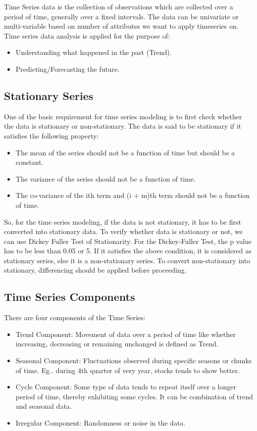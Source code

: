 \documentclass{article}
\begin{document}
Time Series data is the collection of observations which are collected over a period of time, generally over a fixed intervals. The data can be univariate or multi-variable based on number of attributes we want to apply timeseries on. Time series data analysis is applied for the purpose of:

\begin{itemize}
	\item Understanding what happened in the past (Trend).
	\item Predicting/Forecasting the future.
\end{itemize}

\subsection{Stationary Series}
One of the basic requirement for time series modeling is to first check whether the data is stationary or non-stationary. The data is said to be stationary if it satisfies the following  property:

\begin{itemize}
	\item The mean of the series should not be a function of time but should be a constant.
	\item The variance of the series should not be a function of time.
	\item The co-variance of the ith term and (i + m)th term should not be a function of time.
\end{itemize}

So, for the time series modeling, if the data is not stationary, it has to be first converted into stationary data.
To verify whether data is stationary or not, we can use Dickey Fuller Test of Stationarity.
For the Dickey-Fuller Test, the p value has to be less than 0.05 or 5.
If it satisfies the above condition, it is considered as stationary series, else it is a non-stationary series.
To convert non-stationary into stationary, differencing should be applied before proceeding.


\subsection{Time Series Components}
There are four components of the Time Series:

\begin{itemize}
	\item Trend Component:
	Movement of data over a period of time like whether increasing, decreasing or remaining unchanged is defined as Trend.
	\item Seasonal Component:
	Fluctuations observed during specific seasons or chunks of time. Eg.. during 4th quarter of very year, stocks tends to show better.
	\item Cycle Component:
	Some type of data tends to repeat itself over a longer period of time, thereby exhibiting some cycles. It can be combination of trend and seasonal data.
	\item Irregular Component:
	Randomness or noise in the data.
\end{itemize}	
\end{document}
